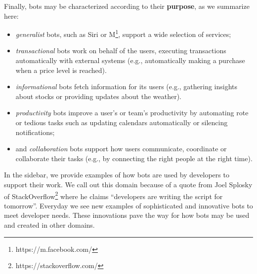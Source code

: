 \documentclass{sig-alternate}
\newcommand{\cl}[1]{\textcolor{blue}{{\it [Carly says: #1]}}}
\begin{document}
Finally, bots may be characterized according to their \textbf{purpose}, as we summarize here: 
\begin{itemize}
\item \emph{generalist} bots, such as Siri or M\footnote{https://m.facebook.com/}, support a wide selection of services; 
\item \emph{transactional} bots work on behalf of the users, executing transactions automatically with external systems (e.g., automatically making a purchase when a price level is reached).  
\item \emph{informational} bots fetch information for its users (e.g., gathering insights about stocks or providing updates about the weather).  
\item \emph{productivity} bots improve a user's or team's productivity by automating rote or tedious tasks such as updating calendars automatically or silencing notifications; 
\item and \emph{collaboration} bots support how users communicate, coordinate or collaborate their tasks (e.g., by connecting the right people at the right time).
\end{itemize}

In the sidebar, we provide examples of how bots are used by developers to support their work. 
We call out this domain because of a quote from Joel Splosky of StackOverflow\footnote{https://stackoverflow.com/\label{StackOverflow}} where he claims ``developers are writing the script for tomorrow''. Everyday we see new examples of sophisticated and innovative bots to meet developer needs. These innovations pave the way for how bots may be used and created in other domains.
	
\end{document}
